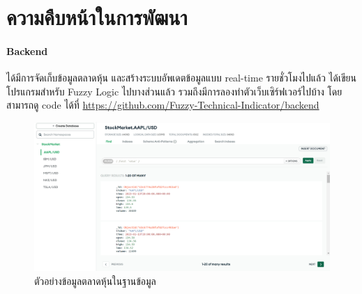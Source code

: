 \chapter{ความคืบหน้าในการพัฒนา}
\subsubsection{Backend}
ได้มีการจัดเก็บข้อมูลตลาดหุ้น และสร้างระบบอัพเดตข้อมูลแบบ real-time รายชั่วโมงไปแล้ว ได้เขียนโปรแกรมสำหรับ Fuzzy Logic ไปบางส่วนแล้ว
รวมถึงมีการลองทำตัวเว็บเซิร์ฟเวอร์ไปบ้าง โดยสามารถดู code ได้ที่ \url{https://github.com/Fuzzy-Technical-Indicator/backend}

\begin{figure}[ht]
    \centering
    \includegraphics[width=\textwidth]{images/db_example.png}
    \caption{ตัวอย่างข้อมูลตลาดหุ้นในฐานข้อมูล}
\end{figure}
\pagebreak

